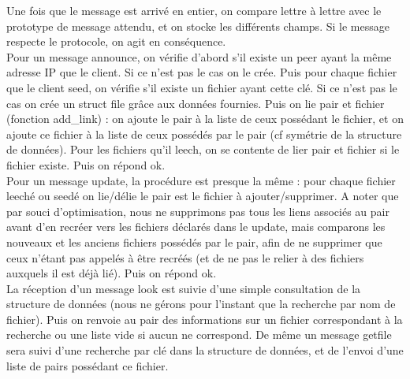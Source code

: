 Une fois que le message est arrivé en entier, on compare lettre à lettre avec le prototype de message attendu, et on stocke les différents champs. Si le message respecte le protocole, on agit en conséquence.\\

Pour un message announce, on vérifie d'abord s'il existe un peer ayant la même adresse IP que le client. Si ce n'est pas le cas on le crée. Puis pour chaque fichier que le client seed, on vérifie s'il existe un fichier ayant cette clé. Si ce n'est pas le cas on crée un struct file grâce aux données fournies. Puis on lie pair et fichier (fonction add\_link) : on ajoute le pair à la liste de ceux possédant le fichier, et on ajoute ce fichier à la liste de ceux possédés par le pair (cf symétrie de la structure de données). Pour les fichiers qu'il leech, on se contente de lier pair et fichier si le fichier existe. Puis on répond ok.\\

Pour un message update, la procédure est presque la même : pour chaque fichier leeché ou seedé on lie/délie le pair est le fichier à ajouter/supprimer. A noter que par souci d'optimisation, nous ne supprimons pas tous les liens associés au pair avant d'en recréer vers les fichiers déclarés dans le update, mais comparons les nouveaux et les anciens fichiers possédés par le pair, afin de ne supprimer que ceux n'étant pas appelés à être recréés (et de ne pas le relier à des fichiers auxquels il est déjà lié). Puis on répond ok.\\

La réception d'un message look est suivie d'une simple consultation de la structure de données (nous ne gérons pour l'instant que la recherche par nom de fichier).
Puis on renvoie au pair des informations sur un fichier correspondant à la recherche ou une liste vide si aucun ne correspond. De même un message getfile sera suivi d'une recherche par clé dans la structure de données, et de l'envoi d'une liste de pairs possédant ce fichier.




